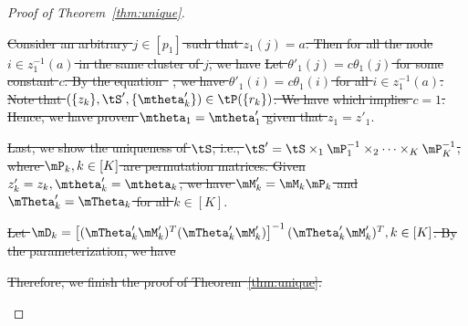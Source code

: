 \documentclass[lettersize,onecolumn,journal]{IEEEtran}
\theoremstyle{definition}
\theoremstyle{definition}
\newcommand{\off}[1]{\left[#1\right]}
\providecommand{\DIFdeltex}[1]{{\protect\color{red}\sout{#1}}}                      %
\providecommand{\DIFdelbegin}{} %
\providecommand{\DIFdelend}{} %
\providecommand{\DIFdel}[1]{\texorpdfstring{\DIFdeltex{#1}}{}} %
\newcommand{\DIFscaledelfig}{0.5}
\newlength{\DIFdelgraphicswidth} %
\newlength{\DIFdelgraphicsheight} %
\newcommand{\DIFdelincludegraphics}[2][]{%
\sbox{\DIFdelgraphicsbox}{\DIFOincludegraphics[#1]{#2}}%
\settoboxwidth{\DIFdelgraphicswidth}{\DIFdelgraphicsbox} %
\settoboxtotalheight{\DIFdelgraphicsheight}{\DIFdelgraphicsbox} %
\scalebox{\DIFscaledelfig}{%
\parbox[b]{\DIFdelgraphicswidth}{\usebox{\DIFdelgraphicsbox}\\[-\baselineskip] \rule{\DIFdelgraphicswidth}{0em}}\llap{\resizebox{\DIFdelgraphicswidth}{\DIFdelgraphicsheight}{%
\setlength{\unitlength}{\DIFdelgraphicswidth}%
\begin{picture}(1,1)%
\thicklines\linethickness{2pt} %
{\color[rgb]{1,0,0}\put(0,0){\framebox(1,1){}}}%
{\color[rgb]{1,0,0}\put(0,0){\line( 1,1){1}}}%
{\color[rgb]{1,0,0}\put(0,1){\line(1,-1){1}}}%
\end{picture}%
}\hspace*{3pt}}} %
} %
\DeclareRobustCommand{\DIFdelbegin}{\DIFOdelbegin \let\includegraphics\DIFdelincludegraphics} %
\DeclareRobustCommand{\DIFdelend}{\DIFOaddend \let\includegraphics\DIFOincludegraphics} %
\begin{document}
\begin{proof}[Proof of Theorem~\ref{thm:unique}]
\begin{enumerate}[wide]
\DIFdel{Consider an arbitrary $j \in [p_1]$ such that $z_1(j) = a$. Then for all the node $i \in  z_1^{-1}(a)$ in the same cluster of $j$, we have 
}%
\DIFdel{Let $\theta'_1(j) = c\theta_1(j)$ for some constant $c$. By the equation~}%
\DIFdel{, we have $\theta'_1(i) = c \theta_1(i)$ for all $ i \in  z_1^{-1}(a)$. Note that $(\{z_k\}, \tS', \{\mtheta'_k\}) \in \tP(\{r_k\})$. We have 
}%
\DIFdel{which implies $c = 1$. Hence, we have proven $\mtheta_1 = \mtheta'_1$ given that $z_1 = z'_1$}\DIFdelend .\DIFdelbegin %

\DIFdel{Last, we show the uniqueness of $\tS$, i.e., $\tS'=\tS\times_1 \mP^{-1}_1\times_2\cdots \times_K \mP^{-1}_K$, where $\mP_k, k \in [K]$ are permutation matrices.  Given $z'_k = z_k, \mtheta'_k = \mtheta_k$, we have $\mM'_k = \mM_k \mP_k$ and $\mTheta'_k = \mTheta_k$ for all $k \in [K]$}\DIFdelend .\DIFdelbegin %

\DIFdel{Let $\mD_k = \off{ (\mTheta'_k \mM'_k)^T (\mTheta'_k \mM'_k) }^{-1} (\mTheta'_k \mM'_k)^T, k \in [K]$. By the parameterization, we have 
}%


\DIFdel{Therefore, we finish the proof of Theorem~\ref{thm:unique}.
}%


\end{enumerate}
\end{proof}
\end{document}
